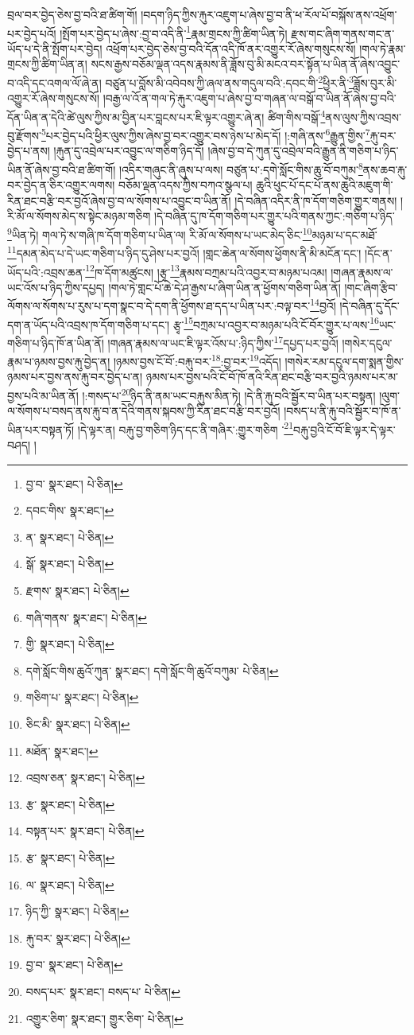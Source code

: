 བྲལ་བར་བྱེད་ཅེས་བྱ་བའི་ཐ་ཚིག་གོ། །བདག་ཉིད་ཀྱིས་རྐུར་འཇུག་པ་ཞེས་བྱ་བ་ནི་ཕ་རོལ་པོ་བསྐོས་ནས་འཕྲོག་པར་བྱེད་པའོ། །སྤོག་པར་བྱེད་པ་ཞེས་:བྱ་བ་འདི་ནི་\footnote{བྱ་བ་  སྣར་ཐང་།  པེ་ཅིན། }རྣམ་གྲངས་ཀྱི་ཚིག་ཡིན་ཏེ། རྫས་གང་ཞིག་གནས་གང་ན་ཡོད་པ་དེ་ནི་སྤོག་པར་བྱེད། འཕྲོག་པར་བྱེད་ཅེས་བྱ་བའི་དོན་འདི་ཁོ་ནར་འགྱུར་རོ་ཞེས་གསུངས་སོ། །གལ་ཏེ་རྣམ་གྲངས་ཀྱི་ཚིག་ཡིན་ན། སངས་རྒྱས་བཅོམ་ལྡན་འདས་རྣམས་ནི་ཟློས་བུ་མི་མངའ་བར་སྟོན་པ་ཡིན་ནོ་ཞེས་འབྱུང་བ་འདི་དང་འགལ་ལོ་ཞེ་ན། བཙུན་པ་བློས་མི་འབེབས་ཀྱི་ཞལ་ནས་གདུལ་བའི་:དབང་གི་\footnote{དབང་གིས་  སྣར་ཐང་། }ཕྱིར་ནི་\footnote{ན་  སྣར་ཐང་།  པེ་ཅིན། }ཟློས་བུར་མི་འགྱུར་རོ་ཞེས་གསུངས་སོ། །བརྒྱ་ལ་འོ་ན་གལ་ཏེ་རྐུར་འཇུག་པ་ཞེས་བྱ་བ་གཞན་ལ་བསྒོ་བ་ཡིན་ནོ་ཞེས་བྱ་བའི་དོན་ཡིན་ན་དེའི་ཚེ་ལུས་ཀྱིས་མ་བྱིན་པར་བླངས་པར་ཇི་ལྟར་འགྱུར་ཞེ་ན། ཚིག་གིས་བསྒོ་\footnote{སྒོ་  སྣར་ཐང་།  པེ་ཅིན། }ནས་ལུས་ཀྱིས་འབྲས་བུ་རྫོགས་\footnote{རྫགས་  སྣར་ཐང་།  པེ་ཅིན། }པར་བྱེད་པའི་ཕྱིར་ལུས་ཀྱིས་ཞེས་བྱ་བར་འགྱུར་བས་ཉེས་པ་མེད་དོ། །:གཞི་ནས་\footnote{གཞི་གནས་  སྣར་ཐང་།  པེ་ཅིན། }རྒྱུན་གྱིས་\footnote{གྱི་  སྣར་ཐང་།  པེ་ཅིན། }རྐུ་བར་བྱེད་པ་ནས། །རྐུན་དུ་འབྲེལ་པར་འབྱུང་ལ་གཅིག་ཉིད་དོ། །ཞེས་བྱ་བ་དེ་ཀུན་དུ་འབྲེལ་བའི་རྒྱུན་ནི་གཅིག་པ་ཉིད་ཡིན་ནོ་ཞེས་བྱ་བའི་ཐ་ཚིག་གོ། །འདིར་གཞུང་ནི་ཞུས་པ་ལས། བཙུན་པ་:དགེ་སློང་གིས་ཆུ་བོ་བཀུམ་\footnote{དགེ་སློང་གིས་ཆུའོ་ཀུན་  སྣར་ཐང་། དགེ་སློང་གི་ཆུའོ་བཀུམ་  པེ་ཅིན། }ནས་ཆབ་རྐུ་བར་བྱེད་ན་ཅིར་འགྱུར་ལགས། བཅོམ་ལྡན་འདས་ཀྱིས་བཀའ་སྩལ་པ། ཆུའི་ཕུང་པོ་དང་པོ་ནས་ཆུའི་མཇུག་གི་རིན་ཐང་བརྩི་བར་བྱའོ་ཞེས་བྱ་བ་ལ་སོགས་པ་འབྱུང་བ་ཡིན་ནོ། །དེ་བཞིན་འདིར་ནི་ཁ་དོག་གཅིག་གྱུར་གནས། །རི་མོ་ལ་སོགས་མེད་ས་སྟེང་མཉམ་གཅིག །དེ་བཞིན་དུ་ཁ་དོག་གཅིག་པར་གྱུར་པའི་གནས་ཀྱང་:གཅིག་པ་ཉིད་\footnote{གཅིག་པ་  སྣར་ཐང་།  པེ་ཅིན། }ཡིན་ཏེ། གལ་ཏེ་ས་གཞི་ཁ་དོག་གཅིག་པ་ཡིན་ལ། རི་མོ་ལ་སོགས་པ་ཡང་མེད་ཅིང་\footnote{ཅིང་མི་  སྣར་ཐང་།  པེ་ཅིན། }མཉམ་པ་དང་མཐོ་\footnote{མཐོན་  སྣར་ཐང་། }དམན་མེད་པ་དེ་ཡང་གཅིག་པ་ཉིད་དུ་ཤེས་པར་བྱའོ། །གླང་ཆེན་ལ་སོགས་ཕྱོགས་ནི་མི་མངོན་དང་། །དོང་ན་ཡོད་པའི་:འབྲས་ཆན་\footnote{འབྲས་ཅན་  སྣར་ཐང་།  པེ་ཅིན། }ཁ་དོག་མཚུངས། །རྩྭ་\footnote{རྩ་  སྣར་ཐང་།  པེ་ཅིན། }རྣམས་བཀྲམ་པའི་འབྱར་བ་མཉམ་པའམ། །གཞན་རྣམས་ལ་ཡང་འོས་པ་ཉིད་ཀྱིས་དཔྱད། །གལ་ཏེ་གླང་པོ་ཆེ་དེ་ཤ་རྒྱས་པ་ཞིག་ཡིན་ན་ཕྱོགས་གཅིག་ཡིན་ནོ། །གང་ཞིག་རྩིབ་ལོགས་ལ་སོགས་པ་རུས་པ་དག་སྣང་བ་དེ་དག་ནི་ཕྱོགས་ཐ་དད་པ་ཡིན་པར་:བལྟ་བར་\footnote{བསྟན་པར་  སྣར་ཐང་།  པེ་ཅིན། }བྱའོ། །དེ་བཞིན་དུ་དོང་དག་ན་ཡོད་པའི་འབྲས་ཁ་དོག་གཅིག་པ་དང་། རྩྭ་\footnote{རྩ་  སྣར་ཐང་།  པེ་ཅིན། }བཀྲམ་པ་འབྱར་བ་མཉམ་པའི་ངོ་བོར་གྱུར་པ་ལས་\footnote{ལ་  སྣར་ཐང་།  པེ་ཅིན། }ཡང་གཅིག་པ་ཉིད་ཁོ་ན་ཡིན་ནོ། །གཞན་རྣམས་ལ་ཡང་ཇི་ལྟར་འོས་པ་:ཉིད་ཀྱིས་\footnote{ཉིད་ཀྱི་  སྣར་ཐང་།  པེ་ཅིན། }དཔྱད་པར་བྱའོ། །གསེར་དངུལ་རྣམ་པ་ཉམས་བྱས་རྐུ་བྱེད་ན། །ཉམས་བྱས་ངོ་བོ་:བརྐུ་བར་\footnote{རྐུ་བར་  སྣར་ཐང་།  པེ་ཅིན། }:བྱ་བར་\footnote{བྱ་བ་  སྣར་ཐང་།  པེ་ཅིན། }འདོད། །གསེར་རམ་དངུལ་དག་སྨན་གྱིས་ཉམས་པར་བྱས་ནས་རྐུ་བར་བྱེད་པ་ན། ཉམས་པར་བྱས་པའི་ངོ་བོ་ཁོ་ནའི་རིན་ཐང་བརྩི་བར་བྱའི་ཉམས་པར་མ་བྱས་པའི་མ་ཡིན་ནོ། །:གསད་པ་\footnote{བསད་པར་  སྣར་ཐང་། བསད་པ་  པེ་ཅིན། }ཉིད་ནི་ནམ་ཡང་བརྐུས་མིན་ཏེ། །དེ་ནི་རྐུ་བའི་སྦྱོར་བ་ཡིན་པར་བསྟན། །ལུག་ལ་སོགས་པ་བསད་ནས་རྐུ་བ་ན་དེའི་གནས་སྐབས་ཀྱི་རིན་ཐང་བརྩི་བར་བྱའོ། །བསད་པ་ནི་རྐུ་བའི་སྦྱོར་བ་ཁོ་ན་ཡིན་པར་བསྟན་ཏོ། །དེ་ལྟར་ན། བརྐུ་བྱ་གཅིག་ཉིད་དང་ནི་གཞིར་:གྱུར་གཅིག ་\footnote{འགྱུར་ཅིག་  སྣར་ཐང་། གྱུར་ཅིག་  པེ་ཅིན། }བརྐུ་བྱའི་ངོ་བོ་ཇི་ལྟར་དེ་ལྟར་བཤད། །

